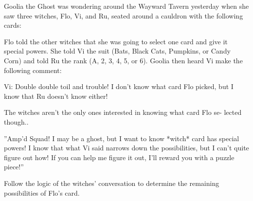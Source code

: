 

Goolia the Ghost was wondering around the Wayward Tavern yesterday when
she saw three witches, Flo, Vi, and Ru, seated around a cauldron with the
following cards:

Flo told the other witches that she was going to select one card and give it
special powers. She told Vi the suit (Bats, Black Cats, Pumpkins, or Candy
Corn) and told Ru the rank (A, 2, 3, 4, 5, or 6). Goolia then heard Vi make
the following comment:

Vi: Double double toil and trouble! I don’t know what card Flo picked, but I
know that Ru doesn’t know either!

The witches aren’t the only ones interested in knowing what card Flo se-
lected though..

”Amp’d Squad! I may be a ghost, but I want to know *witch*
card has special powers! I know that what Vi said narrows down the
possibilities, but I can’t quite figure out how! If you can help me
figure it out, I’ll reward you with a puzzle piece!”

Follow the logic of the witches’ conversation to determine the remaining
possibilities of Flo’s card.
